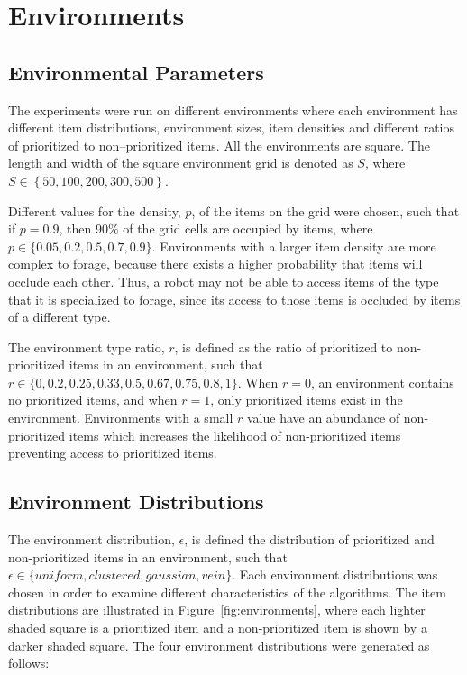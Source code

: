\section{Environments}
\label{experimentenvironments}

\subsection{Environmental Parameters}

The experiments were run on different environments where each environment has different item distributions, environment sizes, item densities and different ratios of prioritized to non--prioritized items. All the environments are square. The length and width of the square environment grid is denoted as $S$, where $S\in \left\{ 50, 100, 200, 300, 500\right\}$.

Different values for the density, $p$, of the items on the grid were chosen, such that if $p=0.9$, then 90\% of the grid cells are occupied by items, where $p\in \{ 0.05,\allowbreak 0.2,\allowbreak 0.5,\allowbreak 0.7,\allowbreak 0.9\}$. Environments with a larger item density are more complex to forage, because there exists a higher probability that items will occlude each other. Thus, a robot may not be able to access items of the type that it is specialized to forage, since its access to those items is occluded by items of a different type.

The environment type ratio, $r$, is defined as the ratio of prioritized to non-prioritized items in an environment, such that $r\in \{0,\allowbreak 0.2,\allowbreak 0.25,\allowbreak 0.33,\allowbreak 0.5,\allowbreak 0.67,\allowbreak 0.75,\allowbreak 0.8, 1\}$. When $r=0$, an environment contains no prioritized items, and when $r=1$, only prioritized items exist in the environment. Environments with a small $r$ value have an abundance of non-prioritized items which increases the likelihood of non-prioritized items preventing access to prioritized items.

\subsection{Environment Distributions}
\label{environmentdistributions}
The environment distribution, $\epsilon$, is defined the distribution of prioritized and non-prioritized items in an environment, such that $\epsilon\in\{uniform, clustered, gaussian, vein\}$. Each environment distributions was chosen in order to examine different characteristics of the algorithms. The item distributions are illustrated in Figure~\ref{fig:environments}, where each lighter shaded square is a prioritized item and a non-prioritized item is shown by a darker shaded square. The four environment distributions were generated as follows:

